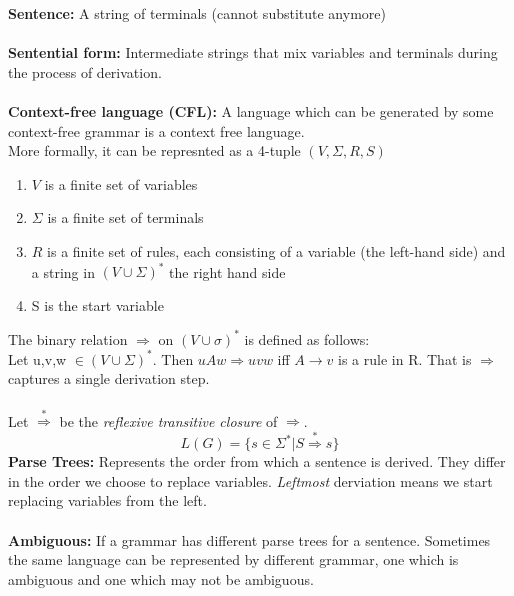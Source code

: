 \documentclass[a4paper,10pt]{article}
\begin{document}
\textcolor{PineGreen}{\textbf{Sentence:}} A string of terminals (cannot substitute anymore) \\\\
\textcolor{PineGreen}{\textbf{Sentential form:}} Intermediate strings that mix variables and terminals during the process of derivation. \\\\
\textcolor{PineGreen}{\textbf{Context-free language (CFL):}} A language which can be generated by some context-free grammar is a context free language.  \\
More formally, it can be represnted as a 4-tuple $(V, \Sigma, R, S)$\\ 
\begin{enumerate}
\item $V$ is a finite set of variables 
\item $\Sigma$ is a finite set of terminals 
\item $R$ is a finite set of rules, each consisting of a variable (the left-hand side) and a string in $(V \cup \Sigma)^{*}$ the right hand side 
\item S is the start variable
\end{enumerate}
The binary relation $\Rightarrow$ on $(V \cup \sigma)^{*}$ is defined as follows: \\ 
Let u,v,w $\in (V \cup \Sigma)^{*}$. Then $uAw \Rightarrow uvw$ iff $A \rightarrow v$ is a rule in R. That is $\Rightarrow$ captures a single derivation step. \\ \\
Let $\overset{*}{\Rightarrow}$ be the \emph{reflexive transitive closure} of $\Rightarrow$. \\
\begin{equation*}
L(G) = \{s \in \Sigma^{*} | S \overset{*}{\Rightarrow} s\}
\end{equation*}
\textcolor{PineGreen}{\textbf{Parse Trees:}} Represents the order from which a sentence is derived. They differ in the order we choose to replace variables. \emph{Leftmost} derviation means we start replacing variables from the left.  \\\\
\textcolor{PineGreen}{\textbf{Ambiguous:}} If a grammar has different parse trees for a sentence. Sometimes the same language can be represented by different grammar, one which is ambiguous and one which may not be ambiguous. \\\\
\newpage 
\end{document}
